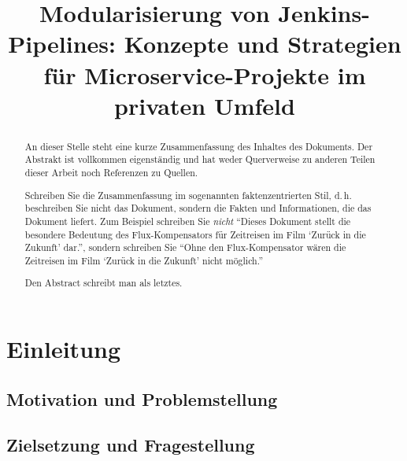 \documentclass[conference,compsoc,final,a4paper]{IEEEtran}
\newcommand{\autoren}[0]{Hammond, Gregory}
\newcommand{\dokumententitel}[0]{Modularisierung von Jenkins-Pipelines: Konzepte und Strategien für Microservice-Projekte im privaten Umfeld}
\begin{document}
\title{\dokumententitel}

\author{
  \IEEEauthorblockN{\autoren}
}

\maketitle
\thispagestyle{plain}
\pagestyle{plain}


\begin{abstract}
An dieser Stelle steht eine kurze Zusammenfassung des Inhaltes des Dokuments. Der Abstrakt ist vollkommen eigenständig und hat weder Querverweise zu anderen Teilen dieser Arbeit noch Referenzen zu Quellen.

Schreiben Sie die Zusammenfassung im sogenannten faktenzentrierten Stil, d.\,h. beschreiben Sie nicht das Dokument, sondern die Fakten und Informationen, die das Dokument liefert. Zum Beispiel schreiben Sie \textit{nicht} \enquote{Dieses Dokument stellt die besondere Bedeutung des Flux-Kompensators für Zeitreisen im Film \enquote{Zurück in die Zukunft} dar.}, sondern schreiben Sie \enquote{Ohne den Flux-Kompensator wären die Zeitreisen im Film \enquote{Zurück in die Zukunft} nicht möglich.}

Den Abstract schreibt man als letztes.
\end{abstract}

{\small\tableofcontents}

\section{Einleitung}
\subsection{Motivation und Problemstellung}
\subsection{Zielsetzung und Fragestellung}
\end{document}
